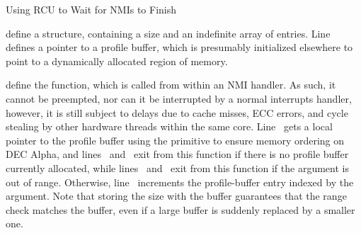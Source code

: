 \begin{listing}[tbp]
\begin{fcvlabel}
\end{fcvlabel}
\caption{Using RCU to Wait for NMIs to Finish}
\label{lst:defer:Using RCU to Wait for NMIs to Finish}
\end{listing}

\begin{fcvref}
 define a  structure, containing a
size and an indefinite array of entries.
Line~ defines a pointer to a profile buffer, which is
presumably initialized elsewhere to point to a dynamically allocated
region of memory.
\end{fcvref}

\begin{fcvref}
 define the  function,
which is called from within an NMI handler.
As such, it cannot be preempted, nor can it be interrupted by a normal
interrupts handler, however, it is still subject to delays due to cache misses,
ECC errors, and cycle stealing by other hardware threads within the same
core.
Line~ gets a local pointer to the profile buffer using the
 primitive to ensure memory ordering on
DEC Alpha, and
lines~ and~ exit from this function if there is no
profile buffer currently allocated, while lines~ and~
exit from this function if the  argument
is out of range.
Otherwise, line~ increments the profile-buffer entry indexed
by the  argument.
Note that storing the size with the buffer guarantees that the
range check matches the buffer, even if a large buffer is suddenly
replaced by a smaller one.
\end{fcvref}

